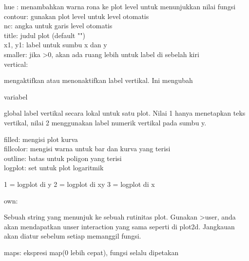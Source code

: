\documentclass[a4paper,10pt]{article}
\begin{document}
\begin{eulernotebook}
\begin{eulercomment}
\begin{eulercomment}
\begin{eulercomment}
hue : menambahkan warna rona ke plot level untuk menunjukkan nilai
fungsi\\
contour: gunakan plot level untuk level otomatis\\
nc: angka untuk garis level otomatis\\
title: judul plot (default "")\\
x1, y1: label untuk sumbu x dan y\\
smaller: jika \textgreater{}0, akan ada ruang lebih untuk label di sebelah kiri\\
vertical:\\
\end{eulercomment}
\begin{eulerttcomment}
  mengaktifkan atau menonaktifkan label vertikal. Ini mengubah
\end{eulerttcomment}
\begin{eulercomment}
variabel\\
\end{eulercomment}
\begin{eulerttcomment}
  global label vertikal secara lokal untuk satu plot. Nilai 1 hanya
  menetapkan teks vertikal, nilai 2 menggunakan label numerik vertikal
  pada sumbu y.
\end{eulerttcomment}
\begin{eulercomment}
filled: mengisi plot kurva\\
fillcolor: mengisi warna untuk bar dan kurva yang terisi\\
outline: batas untuk poligon yang terisi\\
logplot: set untuk plot logaritmik\\
\end{eulercomment}
\begin{eulerttcomment}
         1 = logplot di y
         2 = logplot di xy
         3 = logplot di x
\end{eulerttcomment}
\begin{eulercomment}
own:\\
\end{eulercomment}
\begin{eulerttcomment}
 Sebuah string yang menunjuk ke sebuah rutinitas plot. Gunakan >user,
 anda akan mendapatkan unser interaction yang sama seperti di plot2d.
 Jangkauan akan diatur sebelum setiap memanggil fungsi.
\end{eulerttcomment}
\begin{eulercomment}
maps: ekspresi map(0 lebih cepat), fungsi selalu dipetakan\\

\end{eulercomment}
\end{eulercomment}
\end{eulercomment}
\end{eulernotebook}
\end{document}
